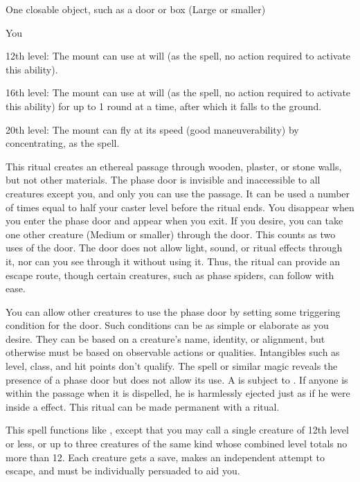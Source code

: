 \begin{spelltarget}{One closable object, such as a door or box (Large or smaller)}
\begin{spelltarget}{You}
\par 12th level: The mount can use  at will (as the spell, no action required to activate this ability).

\par 16th level: The mount can use  at will (as the spell, no action required to activate this ability) for up to 1 round at a time, after which it falls to the ground.

\par 20th level: The mount can fly at its speed (good maneuverability) by concentrating, as the  spell.

\spelleffect This ritual creates an ethereal passage through wooden, plaster, or stone walls, but not other materials. The phase door is invisible and inaccessible to all creatures except you, and only you can use the passage. It can be used a number of times equal to half your caster level before the ritual ends. You disappear when you enter the phase door and appear when you exit. If you desire, you can take one other creature (Medium or smaller) through the door. This counts as two uses of the door. The door does not allow light, sound, or ritual effects through it, nor can you see through it without using it. Thus, the ritual can provide an escape route, though certain creatures, such as phase spiders, can follow with ease.
\par You can allow other creatures to use the phase door by setting some triggering condition for the door. Such conditions can be as simple or elaborate as you desire. They can be based on a creature's name, identity, or alignment, but otherwise must be based on observable actions or qualities. Intangibles such as level, class, and hit points don't qualify.
\spellnotes The  spell or similar magic reveals the presence of a phase door but does not allow its use. A  is subject to . If anyone is within the passage when it is dispelled, he is harmlessly ejected just as if he were inside a  effect. This ritual can be made permanent with a  ritual.

\spelleffect This spell functions like , except that you may call a single creature of 12th level or less, or up to three creatures of the same kind whose combined level totals no more than 12. Each creature gets a save, makes an independent attempt to escape, and must be individually persuaded to aid you.


\end{spelltarget}
\end{spelltarget}
